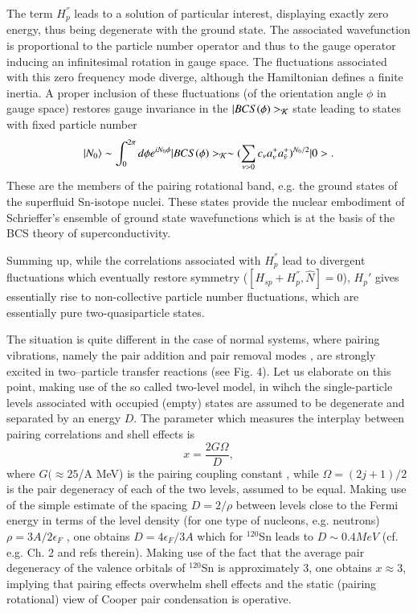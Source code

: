 \documentclass[a4paper,14pt]{book}
\begin{document}
The term $H_p^{''}$ leads to a solution of particular interest, displaying exactly zero energy, thus being degenerate with
the ground state. The associated wavefunction is proportional to the particle number operator and thus to the gauge operator inducing 
an infinitesimal rotation in gauge space. The fluctuations associated with this zero frequency mode diverge, although the Hamiltonian 
defines a finite inertia. 
A proper inclusion of these  fluctuations (of the orientation angle $\phi$ in gauge space) restores gauge invariance in the $|BCS(\phi)>_{\cal K}$
state leading to states with fixed particle number 
\begin{equation}
|N_0\rangle \sim \int_0^{2 \pi} d \phi e^{i N_0 \phi} |BCS(\phi)>_{\cal K} \sim 
(\sum_{\nu>0} c_{\nu} a^+_{\nu}a^+_{\bar \nu})^{N_0/2} |0>.
\end{equation}
These are the members of the pairing rotational band, e.g. the ground states of the superfluid Sn-isotope nuclei. These states provide 
the nuclear embodiment of Schrieffer's ensemble of ground state wavefunctions which is at the basis of the BCS theory of superconductivity. 

Summing up, while the correlations associated with $H_p^{''}$ lead to divergent fluctuations  which eventually restore symmetry
($[H_{sp} + H_p^{''}, \hat N] =0$),
$H_p'$ gives essentially rise  to non-collective particle number fluctuations, which are essentially pure two-quasiparticle states.

The situation is quite different in the case of normal systems, where pairing vibrations, namely the pair addition and pair removal modes \cite{Bohr:64,Bohr:75,Bes:66},
are strongly excited in two--particle  transfer reactions (see Fig. 4). Let us elaborate on this point, making use of the so called two-level 
model, in wihch the single-particle levels associated  with occupied (empty) states are assumed to be degenerate and separated by an energy $D$. 
The parameter which measures the interplay between pairing correlations and shell effects is
\begin{equation}
x = \frac{2 G \Omega}{D},
\end{equation}
where $G (\approx 25 $/A MeV) is the pairing coupling constant , while $\Omega = (2 j+1)/2$ is the pair degeneracy
of each of the two levels, assumed to be equal. Making use of the simple estimate of the spacing $D=2/\rho$ between levels close to the Fermi energy
in terms of the level density  (for one type of nucleons, e.g. neutrons) $\rho = 3A/2 \epsilon_F$ \cite{Bohr:69}, one obtains $D= 4 \epsilon_F/3A$ which 
 for $^{120}$Sn leads to $D \sim 0.4 MeV$ (cf. e.g. \cite{Brink:05} Ch. 2 and refs therein). Making use of the fact that the average pair degeneracy of the valence orbitals of $^{120}$Sn is
approximately 3,  one obtains $x \approx 3$, implying that pairing  effects overwhelm shell effects  and the static (pairing rotational) 
view of Cooper pair condensation is operative. 
\end{document}
